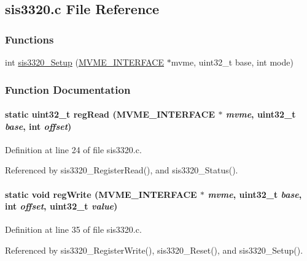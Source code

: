 \subsection{sis3320.c File Reference}
\label{sis3320_8c}
\subsubsection*{Functions}
\begin{DoxyCompactItemize}
\item 
int \hyperlink{sis3320_8c_a82a1d41eb9db90c6723165a71cba97b8}{sis3320\_\-Setup} (\hyperlink{structMVME__INTERFACE}{MVME\_\-INTERFACE} $\ast$mvme, uint32\_\-t base, int mode)
\end{DoxyCompactItemize}


\subsubsection{Function Documentation}
\paragraph[{regRead}]{\setlength{\rightskip}{0pt plus 5cm}static uint32\_\-t regRead ({\bf MVME\_\-INTERFACE} $\ast$ {\em mvme}, \/  uint32\_\-t {\em base}, \/  int {\em offset})}\hfill\label{sis3320_8c_a2296a7241a9fb55be401fb5c9845c7b7}


Definition at line 24 of file sis3320.c.

Referenced by sis3320\_\-RegisterRead(), and sis3320\_\-Status().
\paragraph[{regWrite}]{\setlength{\rightskip}{0pt plus 5cm}static void regWrite ({\bf MVME\_\-INTERFACE} $\ast$ {\em mvme}, \/  uint32\_\-t {\em base}, \/  int {\em offset}, \/  uint32\_\-t {\em value})}\hfill\label{sis3320_8c_af268fb97f4bcf3a3c0d4e2839c5a2a93}


Definition at line 35 of file sis3320.c.

Referenced by sis3320\_\-RegisterWrite(), sis3320\_\-Reset(), and sis3320\_\-Setup().
